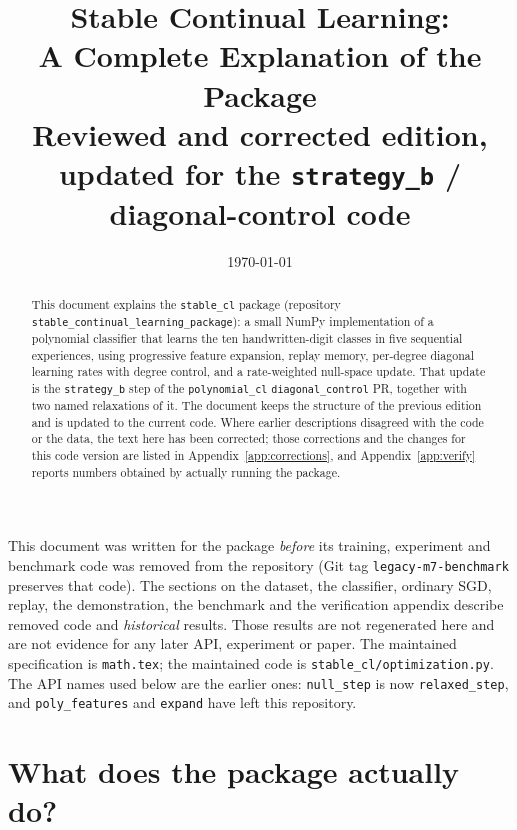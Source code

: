 \documentclass[11pt,a4paper]{article}
\title{Stable Continual Learning:\\ A Complete Explanation of the Package\\[4pt]
\large Reviewed and corrected edition, updated for the \texttt{strategy\_b} / diagonal-control code}
\author{}
\date{\today}
\newcommand{\code}[1]{\texttt{#1}}
\begin{document}
\maketitle

\begin{reviewbox}[title={Status of this document}]
This document was written for the package \emph{before} its training, experiment and benchmark code was
removed from the repository (Git tag \code{legacy-m7-benchmark} preserves that code). The sections on the
dataset, the classifier, ordinary SGD, replay, the demonstration, the benchmark and the verification
appendix describe removed code and \emph{historical} results. Those results are not regenerated here and
are not evidence for any later API, experiment or paper. The maintained specification is \code{math.tex};
the maintained code is \code{stable\_cl/optimization.py}. The API names used below are the earlier ones: \code{null\_step} is now \code{relaxed\_step}, and \code{poly\_features} and \code{expand} have left this repository.
\end{reviewbox}

\begin{abstract}
\noindent This document explains the \code{stable\_cl} package (repository \code{stable\_continual\_learning\_package}): a small NumPy implementation of a polynomial classifier that learns the ten handwritten-digit classes in five sequential experiences, using progressive feature expansion, replay memory, per-degree diagonal learning rates with degree control, and a rate-weighted null-space update. That update is the \code{strategy\_b} step of the \code{polynomial\_cl} \code{diagonal\_control} PR, together with two named relaxations of it. The document keeps the structure of the previous edition and is updated to the current code. Where earlier descriptions disagreed with the code or the data, the text here has been corrected; those corrections and the changes for this code version are listed in Appendix~\ref{app:corrections}, and Appendix~\ref{app:verify} reports numbers obtained by actually running the package.
\end{abstract}

{\setcounter{tocdepth}{1}\setlength{\parskip}{0pt}\tableofcontents}
\newpage

\section{What does the package actually do?}
\end{document}
